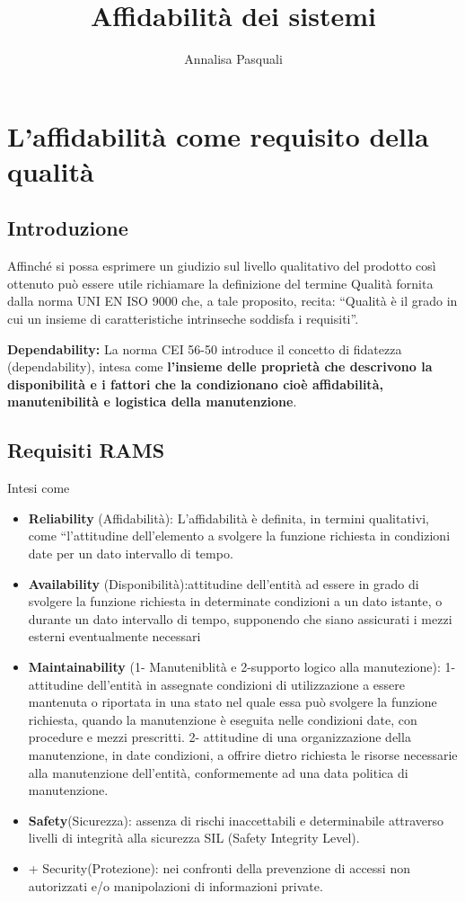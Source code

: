 \documentclass{report}
\title{Affidabilità dei sistemi}
\date{Annalisa Pasquali}
\begin{document}
\maketitle

\tableofcontents
\newpage


\chapter{L'affidabilità come requisito della qualità}

\section{Introduzione}
Affinché si possa esprimere un giudizio sul livello qualitativo del
prodotto così ottenuto può essere utile richiamare la definizione
del termine Qualità fornita dalla norma UNI EN ISO 9000 che, a
tale proposito, recita: “Qualità è il grado in cui un insieme di
caratteristiche intrinseche soddisfa i requisiti”.

\noindent \textbf{Dependability:} La norma CEI 56-50 introduce il concetto di fidatezza (dependability), intesa
come \textbf{l’insieme delle proprietà che descrivono la disponibilità e i
fattori che la condizionano cioè affidabilità, manutenibilità e
logistica della manutenzione}.

\section{Requisiti RAMS}
Intesi come
\begin{itemize}
    \item \textbf{Reliability} (Affidabilità): L’affidabilità è definita, in termini
    qualitativi, come “l’attitudine dell’elemento a svolgere la funzione
    richiesta in condizioni date per un dato intervallo di tempo.    
    \item \textbf{Availability} (Disponibilità):attitudine dell’entità ad essere in grado
    di svolgere la funzione richiesta in determinate condizioni a un dato
    istante, o durante un dato intervallo di tempo, supponendo che
    siano assicurati i mezzi esterni eventualmente necessari
    \item \textbf{Maintainability} (1- Manuteniblità e 2-supporto logico alla manutezione): 1-attitudine dell’entità in
    assegnate condizioni di utilizzazione a essere mantenuta o
    riportata in una stato nel quale essa può svolgere la funzione
    richiesta, quando la manutenzione è eseguita nelle condizioni
    date, con procedure e mezzi prescritti. 
    2- attitudine di una organizzazione della
    manutenzione, in date condizioni, a offrire dietro richiesta le
    risorse necessarie alla manutenzione dell’entità, conformemente
    ad una data politica di manutenzione.
    \item \textbf{Safety}(Sicurezza): assenza di rischi inaccettabili e determinabile
    attraverso livelli di integrità alla sicurezza SIL (Safety Integrity
    Level).
    \item + Security(Protezione): nei confronti della prevenzione di accessi non
    autorizzati e/o manipolazioni di informazioni private.
\end{itemize}
\end{document}
